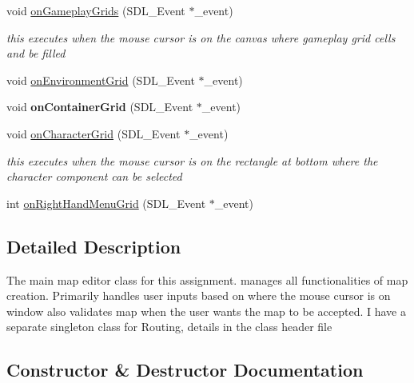 \begin{DoxyCompactItemize}
void \hyperlink{class_map_editor_engine_a4aa53b24a48445df239f7bc343857959}{on\+Gameplay\+Grids} (S\+D\+L\+\_\+\+Event $\ast$\+\_\+event)
\begin{DoxyCompactList}\small\item\em this executes when the mouse cursor is on the canvas where gameplay grid cells and be filled \end{DoxyCompactList}\item 
void \hyperlink{class_map_editor_engine_af7f6e1fec6f7598ace52902f996980bd}{on\+Environment\+Grid} (S\+D\+L\+\_\+\+Event $\ast$\+\_\+event)
\item 
\hypertarget{class_map_editor_engine_a9d1cd8cd4d5428b30935f87121e91520}{}\label{class_map_editor_engine_a9d1cd8cd4d5428b30935f87121e91520} 
void {\bfseries on\+Container\+Grid} (S\+D\+L\+\_\+\+Event $\ast$\+\_\+event)
\item 
\hypertarget{class_map_editor_engine_ab21650a2996bc8b0d7234043b090aadc}{}\label{class_map_editor_engine_ab21650a2996bc8b0d7234043b090aadc} 
void \hyperlink{class_map_editor_engine_ab21650a2996bc8b0d7234043b090aadc}{on\+Character\+Grid} (S\+D\+L\+\_\+\+Event $\ast$\+\_\+event)
\begin{DoxyCompactList}\small\item\em this executes when the mouse cursor is on the rectangle at bottom where the character component can be selected \end{DoxyCompactList}\item 
int \hyperlink{class_map_editor_engine_a5cac60e9a046a903de4a1f570b15bb29}{on\+Right\+Hand\+Menu\+Grid} (S\+D\+L\+\_\+\+Event $\ast$\+\_\+event)
\end{DoxyCompactItemize}


\subsection{Detailed Description}
The main map editor class for this assignment. manages all functionalities of map creation. Primarily handles user inputs based on where the mouse cursor is on window also validates map when the user wants the map to be accepted. I have a separate singleton class for Routing, details in the class header file 

\subsection{Constructor \& Destructor Documentation}
\hypertarget{class_map_editor_engine_ae709ea10e7b1a97a9178745793932ab4}{}\label{class_map_editor_engine_ae709ea10e7b1a97a9178745793932ab4} 
